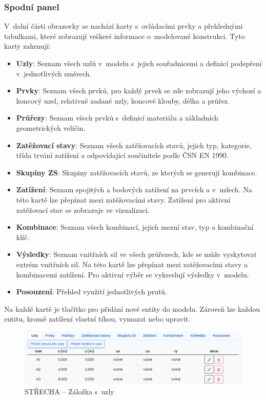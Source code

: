 \subsubsection*{Spodní panel}
V~dolní části obrazovky se nachází karty s~ovládacími prvky a přehlednými tabulkami, které zobrazují veškeré informace o~modelované konstrukci. Tyto karty zahrnují:
\begin{itemize}
    \item \textbf{Uzly}: Seznam všech uzlů v~modelu s~jejich souřadnicemi a definicí podepření v~jednotlivých směrech.
    \item \textbf{Prvky}: Seznam všech prvků, pro každý prvek se zde zobrazují jeho výchozí a koncový uzel, relativně zadané uzly, koncové klouby, délka a průřez.
    \item \textbf{Průřezy}: Seznam všech prvků s~definicí materiálu a základních geometrických veličin.
    \item \textbf{Zatěžovací stavy}: Seznam všech zatěžovacích stavů, jejich typ, kategorie, třída trvání zatížení a odpovídající součinitele podle ČSN EN 1990.
    \item \textbf{Skupiny ZS}: Skupiny zatěžovacích stavů, ze kterých se generují kombinace.
    \item \textbf{Zatížení}: Seznam spojitých a bodových zatížení na prvcích a v~uzlech. Na této kartě lze přepínat mezi zatěžovacími stavy. Zatížení pro aktivní zatěžovací stav se zobrazuje ve vizualizaci.
    \item \textbf{Kombinace}: Seznam všech kombinací, jejich mezní stav, typ a kombinační klíč.
    \item \textbf{Výsledky}: Seznam vnitřních sil ve všech průřezech, kde se může vyskytovat extrém vnitřních sil. Na této kartě lze přepínat mezi zatěžovacími stavy a kombinacemi zatížení. Pro aktivní výběr se vykreslují výsledky v~modelu.
    \item \textbf{Posouzení}: Přehled využití jednotlivých prutů.
\end{itemize}

Na každé kartě je tlačítko pro přidání nové entity do modelu. Zároveň lze každou entitu, kromě zatížení vlastní tíhou, vymazat nebo upravit.

\begin{figure}[H]
    \includegraphics{assets/figures/wbapp/nodes_tab.png}
    \caption{STŘECHA -- Záložka s~uzly}
    \label{fig:nodes}
\end{figure}

